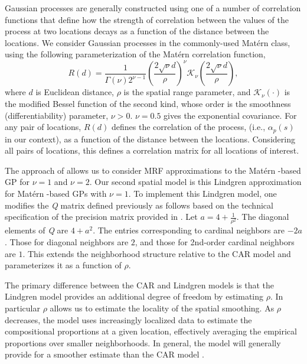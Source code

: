 \documentclass[10pt,letterpaper]{article}
\newcommand{\matern}{Mat\'{e}rn }
\begin{document}
Gaussian processes are generally constructed using
one of a number of correlation functions that define how the strength
of correlation between the values of the process at two locations
decays as a function of the distance between the locations. We consider
Gaussian processes in the commonly-used \matern
class, using the following parameterization of the \matern correlation
function, 
\begin{equation}
R(d)=\frac{1}{\Gamma(\nu)2^{\nu-1}}\left(\frac{2\sqrt{\nu}d}{\rho}\right)^{\nu}\mathcal{K}_{\nu}\left(\frac{2\sqrt{\nu}d}{\rho}\right),\nonumber
\end{equation}
where $d$ is Euclidean distance, $\rho$ is the spatial range parameter,
and $\mathcal{K}_{\nu}(\cdot)$ is the modified Bessel function of
the second kind, whose order is the smoothness (differentiability)
parameter, $\nu>0$. $\nu=0.5$ gives the exponential covariance.
For any pair of locations, $R(d)$ defines the correlation of the
process, (i.e., $\alpha_{p}(s)$ in our context), as a function of
the distance between the locations. Considering all pairs of locations,
this defines a correlation matrix for all locations of interest. 

The approach of \cite{Lind:etal:2011} allows us to consider MRF
approximations to the \matern-based GP for $\nu=1$ and $\nu=2$.
Our second spatial model is this Lindgren approximation for \matern-based
GPs with $\nu=1$. To implement this Lindgren model, one modifies
the \emph{Q} matrix defined previously as follows based
on the technical specification of the precision matrix provided in
\cite{Lind:etal:2011}. Let $a=4+\frac{1}{\rho^{2}}$. The diagonal
elements of \emph{Q} are $4+a^{2}$. The entries corresponding to cardinal
neighbors are $-2a$. Those for diagonal neighbors are $2$, and those
for 2nd-order cardinal neighbors are $1$. This extends the neighborhood
structure relative to the CAR model and parameterizes it as a function
of $\rho$.

The primary difference between the CAR and Lindgren models is that
the Lindgren model provides an additional degree of freedom by estimating
$\rho$. In particular $\rho$ allows us to estimate the locality
of the spatial smoothing. As $\rho$ decreases, the
model uses increasingly localized data to estimate the compositional
proportions at a given location, effectively averaging the empirical
proportions over smaller neighborhoods. In general, the \cite{Lind:etal:2011}
model will generally provide for a smoother estimate than the CAR
model \cite{Paci:2013}. 
\end{document}
